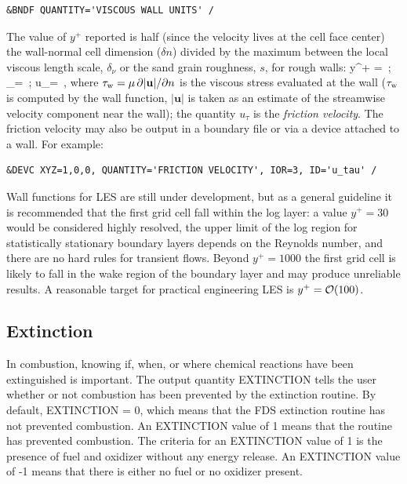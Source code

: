 \documentclass[11pt]{book}
\begin{document}
\begin{lstlisting}
&BNDF QUANTITY='VISCOUS WALL UNITS' /
\end{lstlisting}

\noindent
The value of $y^+$ reported is half (since the velocity lives at the cell face center) the wall-normal cell dimension ($\delta n$) divided by the maximum between the local viscous length scale, $\delta_\nu$ \cite{Pope:2000} or the sand grain roughness, $s$, for rough walls:
\be
y^+ =  \,\mbox{;} \quad\quad \delta_\nu =  \,\mbox{;} \quad\quad u_\tau =  \,\mbox{,}
\ee
where $\tau_{\rm w} = \mu\,\partial |\mathbf{u}|/\partial n$ is the viscous stress evaluated at the wall ($\tau_{\rm w}$ is computed by the wall function, $|\mathbf{u}|$ is taken as an estimate of the streamwise velocity component near the wall); the quantity $u_\tau$ is the \emph{friction velocity}.  The friction velocity may also be output in a boundary file or via a device attached to a wall.  For example:
\begin{lstlisting}
&DEVC XYZ=1,0,0, QUANTITY='FRICTION VELOCITY', IOR=3, ID='u_tau' /
\end{lstlisting}

\noindent Wall functions for LES are still under development, but as a general guideline it is recommended that the first grid cell fall within the log layer: a value $y^+=30$ would be considered highly resolved, the upper limit of the log region for statistically stationary boundary layers depends on the Reynolds number, and there are no hard rules for transient flows.  Beyond $y^+=1000$ the first grid cell is likely to fall in the wake region of the boundary layer and may produce unreliable results.  A reasonable target for practical engineering LES is $y^+ = {\cal O}(100)$.


\subsection{Extinction}
\label{info:extinct_out}
In combustion, knowing if, when, or where chemical reactions have been extinguished is important. The output quantity {\ct EXTINCTION} tells the user whether or not combustion has been prevented by the extinction routine. By default, {\ct EXTINCTION} = 0, which means that the FDS extinction routine has not prevented combustion. An {\ct EXTINCTION} value of 1 means that the routine has prevented combustion. The criteria for an {\ct EXTINCTION} value of 1 is the presence of fuel and oxidizer without any energy release. An {\ct EXTINCTION} value of -1 means that there is either no fuel or no oxidizer present.
\end{document}
